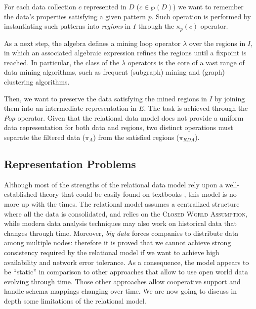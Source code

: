 For each data collection $c$ represented in $D$ ($c\in \wp(D)$) we want to remember the data's properties satisfying a given pattern $p$. Such operation is performed by instantiating such patterns into \textit{regions} in $I$ through the $\kappa_p(c)$ operator.

As a next step, the algebra defines a mining loop operator $\lambda$\index{$\lambda$} over the regions in $I$, in which an associated algebraic expression refines the regions until a fixpoint is reached. In particular, the class of the $\lambda$ operators is the core of a vast range of data mining algorithms, such as frequent (subgraph) mining \cite{JunghannsKAPR17} and (graph) clustering \cite{vanDongen2012} algorithms.  

Then, we want to preserve the data satisfying the mined regions in $I$ by joining them into an intermediate representation in $E$. The task is achieved through the $Pop$ operator. Given that the relational data model does not provide a uniform data representation for both data and regions, two distinct operations must separate the filtered data ($\pi_A$) from the satisfied regions ($\pi_{RDA}$).

\subsection{Representation Problems}\label{sec:relreprprob}
Although most of the strengths of the relational data model rely upon a well-established theory \cite{Codd} that could be easily found on textbooks \cite{Garcia-Molina}, this model is no more up with the times. The relational model assumes a centralized structure where all the data is consolidated, and relies on the \textsc{Closed World Assumption}, while modern data analysis techniques may also work on historical data that changes through time. Moreover, \textit{big data} forces companies to distribute data among multiple nodes: therefore it is proved \cite{Gilbert02} that we cannot achieve strong consistency required by the relational model if we want to achieve high availability and network error tolerance. As a consequence, the model appears to be ``static'' \cite{Badia} in comparison to other approaches that allow to use open world data evolving through time. Those other approaches allow cooperative support \cite{Aligon201520} and  handle schema mappings changing over time.  We are now going to discuss in depth some limitations of the relational model.


